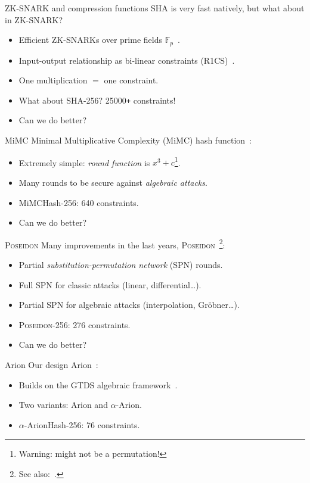 \documentclass{beamer}
\newcommand{\Mimc}{\textnormal{MiMC}}
\newcommand{\Mimchash}{\textnormal{MiMCHash}}
\newcommand{\Poseidon}{\textnormal{\textsc{Poseidon}}}
\newcommand{\Arion}{\textnormal{\textsf{Arion}}}
\newcommand{\Aarion}{\textnormal{\(\alpha \)-\Arion}}
\newcommand{\Arionhash}{\textnormal{\textsf{ArionHash}}}
\newcommand{\Aarionhash}{\textnormal{\(\alpha \)-\Arionhash}}
\begin{document}
\begin{frame}{ZK-SNARK and compression functions}
  SHA is very fast natively, but what about in ZK-SNARK\@?
  \begin{itemize}
    \item Efficient ZK-SNARKs over prime fields \(\mathbb{F}_p\)~\cite{GennaroGPR2012}.
    \item Input-output relationship as bi-linear constraints (R1CS)~\cite{SassonCTV2013}.
    \item One multiplication \(=\) one constraint. 
    \item What about SHA-256? 25000\texttt{+} constraints!
    \item Can we do better?
  \end{itemize}  
\end{frame}

\begin{frame}{\Mimc}
  Minimal Multiplicative Complexity (\Mimc) hash function~\cite{AlbrechtGRRT2016}:
  \begin{itemize}
    \item Extremely simple: \emph{round function} is \(x^3 + c\)\footnote{Warning: might not be a 
          permutation!}.
    \item Many rounds to be secure against \emph{algebraic attacks}.
    \item \Mimchash-256: 640 constraints.
    \item Can we do better?
  \end{itemize}  
\end{frame}

\begin{frame}{\Poseidon}
  Many improvements in the last years, \Poseidon~\cite{GrassiKRRS2021}\footnote{
    See also:~\cite{GrassiHRSWW2022,BouvierBCPSVW2022,AlyABDS2019}.}:
  \begin{itemize}
    \item Partial \emph{substitution-permutation network} (SPN) rounds.
    \item Full SPN for classic attacks (linear, differential\dots).
    \item Partial SPN for algebraic attacks (interpolation, Gr\"{o}bner\dots).
    \item \Poseidon-256: 276 constraints.
    \item Can we do better?
  \end{itemize}
\end{frame}

\begin{frame}{\Arion}
  Our design \Arion~\cite{RoyST2023}:
  \begin{itemize}
    \item Builds on the GTDS algebraic framework~\cite{RoyS2022}.
    \item Two variants: \Arion{} and \Aarion.
    \item \Aarionhash-256: 76 constraints.
  \end{itemize}
\end{frame}
\end{document}
